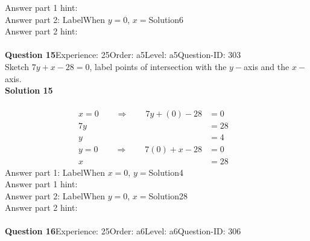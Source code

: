 \documentclass{article}
\begin{document}
Answer part 1 hint: \hspace{15pt}\\
Answer part 2: \hspace{10pt}Label\hspace{10pt}When $y=0$, $x=$\hspace{10pt}Solution\hspace{10pt}6\\
Answer part 2 hint: \hspace{15pt}\\
\\[4pt]
\noindent\textbf{Question 15}\hspace{20pt}Experience: 25\hspace{20pt}Order: a5\hspace{20pt}Level: a5\hspace{20pt}Question-ID: 303\\[2pt]
Sketch $7y+x-28=0$, label points of intersection with the $y-$axis and the $x-$axis.\\[4pt]
\noindent\textbf{Solution 15}\\[2pt]
\\[-35pt]\begin{align*}
x=0\qquad\Rightarrow\qquad 7y+(0)-28&=0&\\[2pt]
7y&=28\\[2pt]
y&=4\\[12pt]
y=0\qquad\Rightarrow\qquad 7(0)+x-28&=0&\\[2pt]
x&=28
\end{align*}
Answer part 1: \hspace{10pt}Label\hspace{10pt}When $x=0$, $y=$\hspace{10pt}Solution\hspace{10pt}4\\
Answer part 1 hint: \hspace{15pt}\\
Answer part 2: \hspace{10pt}Label\hspace{10pt}When $y=0$, $x=$\hspace{10pt}Solution\hspace{10pt}28\\
Answer part 2 hint: \hspace{15pt}\\
\\[4pt]
\noindent\textbf{Question 16}\hspace{20pt}Experience: 25\hspace{20pt}Order: a6\hspace{20pt}Level: a6\hspace{20pt}Question-ID: 306\\[2pt]
\end{document}
